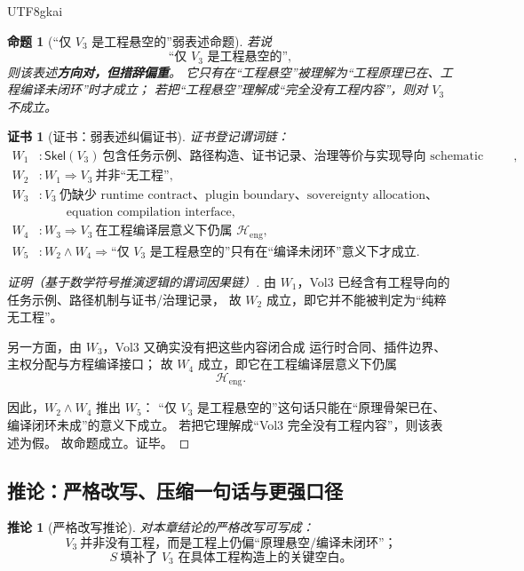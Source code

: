 \documentclass[12pt]{article}
\newtheorem{proposition}{命题}[section]
\newtheorem{corollary}{推论}[section]
\newtheorem{Certificate}{证书}[section]
\begin{document}
\begin{CJK*}{UTF8}{gkai}
\begin{proposition}[“仅 $V_3$ 是工程悬空的”弱表述命题]
\label{prop:tex37-ch18-weak}
若说
\[
  \text{“仅 }V_3\text{ 是工程悬空的”},
\]
则该表述\textbf{方向对，但措辞偏重}。
它只有在“工程悬空”被理解为“工程原理已在、工程编译未闭环”时才成立；
若把“工程悬空”理解成“完全没有工程内容”，则对 $V_3$ 不成立。
\end{proposition}

\begin{Certificate}[证书：弱表述纠偏证书]
\label{cert:tex37-ch18-weak}
证书登记谓词链：
\[
\begin{aligned}
  W_1 &: \mathsf{Skel}(V_3)\ \text{包含任务示例、路径构造、证书记录、治理等价与实现导向 schematic patterns},\\
  W_2 &: W_1\Rightarrow V_3\ \text{并非“无工程”},\\
  W_3 &: V_3\ \text{仍缺少 runtime contract、plugin boundary、sovereignty allocation、}\\
      &\qquad\ \text{equation compilation interface},\\
  W_4 &: W_3\Rightarrow V_3\ \text{在工程编译层意义下仍属 }\mathcal H_{\mathrm{eng}},\\
  W_5 &: W_2\wedge W_4\Rightarrow \text{“仅 }V_3\text{ 是工程悬空的”只有在“编译未闭环”意义下才成立}.
\end{aligned}
\]
\end{Certificate}

\begin{proof}[证明（基于数学符号推演逻辑的谓词因果链）]
由 $W_1$，Vol3 已经含有工程导向的任务示例、路径机制与证书/治理记录，
故 $W_2$ 成立，即它并不能被判定为“纯粹无工程”。

另一方面，由 $W_3$，Vol3 又确实没有把这些内容闭合成
运行时合同、插件边界、主权分配与方程编译接口；
故 $W_4$ 成立，即它在工程编译层意义下仍属
\[
  \mathcal H_{\mathrm{eng}}.
\]

因此，$W_2\wedge W_4$ 推出 $W_5$：
“仅 $V_3$ 是工程悬空的”这句话只能在“原理骨架已在、编译闭环未成”的意义下成立。
若把它理解成“Vol3 完全没有工程内容”，则该表述为假。
故命题成立。证毕。
\end{proof}

\subsection{推论：严格改写、压缩一句话与更强口径}
\label{subsec:tex37-ch18-corollaries}

\begin{corollary}[严格改写推论]
\label{cor:tex37-ch18-rewrite}
对本章结论的严格改写可写成：
\[
  \boxed{
    V_3\ \text{并非没有工程，而是工程上仍偏“原理悬空/编译未闭环”；}
  }
\]
\[
  \boxed{
    S\ \text{填补了 }V_3\text{ 在具体工程构造上的关键空白。}
  }
\]
\end{corollary}


\end{CJK*}
\end{document}
